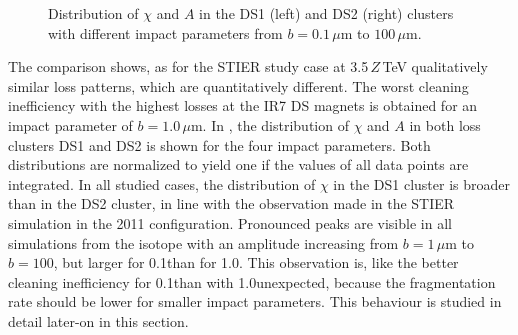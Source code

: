 \begin{figure}[htbp]
  \centering
  \caption{Distribution of $\chi$ and $A$ in the DS1 (left) and DS2 (right) clusters with different impact parameters from $b=0.1\,\mu$m to $100\,\mu$m.}  
  \label{pic:16062204}
  \end{figure}

The comparison shows, as for the STIER study case at 3.5\,$Z\,$TeV qualitatively similar loss patterns, which are quantitatively different. The worst cleaning inefficiency with the highest losses at the IR7 DS magnets is obtained for an impact parameter of $b=1.0\,\mu$m. In , the distribution of $\chi$ and $A$ in both loss clusters DS1 and DS2 is shown for the four impact parameters. Both distributions are normalized to yield one if the values of all data points are integrated. In all studied cases, the distribution of $\chi$ in the DS1 cluster is broader than in the DS2 cluster, in line with the observation made in the STIER simulation in the 2011 configuration. Pronounced peaks are visible in all simulations from the isotope  with an amplitude increasing from $b=1\,\mu$m to $b=100$\mum, but larger for 0.1\mum than for 1.0\mum. This observation is, like the better cleaning inefficiency for 0.1\mum than with 1.0\mum unexpected, because the fragmentation rate should be lower for smaller impact parameters. This behaviour is studied in detail later-on in this section. 



